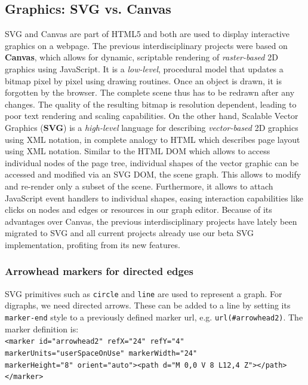 \subsection{Graphics: SVG vs. Canvas}\label{sec:graphics}
SVG and Canvas are part of HTML5 and both are used to display interactive graphics on a webpage. 
The previous interdisciplinary projects were based on \textbf{Canvas}, which allows for dynamic, scriptable rendering of \textit{raster-based} 2D graphics using JavaScript. It is a \textit{low-level}, procedural model that updates a bitmap pixel by pixel using drawing routines. Once an object is drawn, it is forgotten by the browser. The complete scene thus has to be redrawn after any changes. The quality of the resulting bitmap is resolution dependent, leading to poor text rendering and scaling capabilities. 
On the other hand, Scalable Vector Graphics (\textbf{SVG}) is a \textit{high-level} language for describing \textit{vector-based} 2D graphics using XML notation, in complete analogy to HTML which describes page layout using XML notation. Similar to the HTML DOM which allows to access individual nodes of the page tree, individual shapes of the vector graphic can be accessed and modified via an SVG DOM, the scene graph. This allows to modify and re-render only a subset of the scene. Furthermore, it allows to attach JavaScript event handlers to individual shapes, easing interaction capabilities like clicks on nodes and edges or resources in our graph editor. Because of its advantages over Canvas, the previous interdisciplinary projects have lately been migrated to SVG \cite{feil2016idp} and all current projects \cite{feil2016idp,fischer2016idp} already use our beta SVG implementation, profiting from its new features.

\subsubsection{Arrowhead markers for directed edges}
SVG primitives such as \texttt{circle} and \texttt{line} are used to represent a graph. For digraphs, we need directed arrows. These can be added to a line by setting its \texttt{marker-end} style to a  previously defined marker url, e.g. \texttt{url(\#arrowhead2)}. The marker definition is:\\
{\footnotesize{\texttt{<marker id="arrowhead2" refX="24" refY="4" markerUnits="userSpaceOnUse" markerWidth="24" \\ markerHeight="8" orient="auto"><path d="M 0,0 V 8 L12,4 Z"></path></marker>}}}

